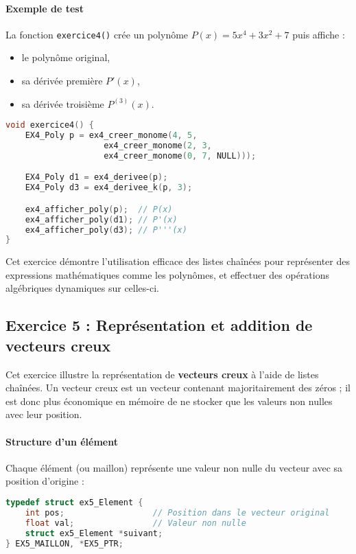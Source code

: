 \documentclass[a4paper,12pt]{article}
\begin{document}
\paragraph{Exemple de test}

La fonction \texttt{exercice4()} crée un polynôme $P(x) = 5x^4 + 3x^2 + 7$ puis affiche :

\begin{itemize}
    \item le polynôme original,
    \item sa dérivée première $P'(x)$,
    \item sa dérivée troisième $P^{(3)}(x)$.
\end{itemize}

\begin{lstlisting}[language=C, caption={Exemple de test}]
void exercice4() {
    EX4_Poly p = ex4_creer_monome(4, 5,
                    ex4_creer_monome(2, 3,
                    ex4_creer_monome(0, 7, NULL)));

    EX4_Poly d1 = ex4_derivee(p);
    EX4_Poly d3 = ex4_derivee_k(p, 3);

    ex4_afficher_poly(p);  // P(x)
    ex4_afficher_poly(d1); // P'(x)
    ex4_afficher_poly(d3); // P'''(x)
}
\end{lstlisting}

Cet exercice démontre l’utilisation efficace des listes chaînées pour représenter des expressions mathématiques comme les polynômes, et effectuer des opérations algébriques dynamiques sur celles-ci.


\subsection{Exercice 5 : Représentation et addition de vecteurs creux}

Cet exercice illustre la représentation de \textbf{vecteurs creux} à l’aide de listes chaînées. Un vecteur creux est un vecteur contenant majoritairement des zéros ; il est donc plus économique en mémoire de ne stocker que les valeurs non nulles avec leur position.

\paragraph{Structure d’un élément}

Chaque élément (ou maillon) représente une valeur non nulle du vecteur avec sa position d’origine :

\begin{lstlisting}[language=C, caption={Structure d’un vecteur creux}]
typedef struct ex5_Element {
    int pos;                  // Position dans le vecteur original
    float val;                // Valeur non nulle
    struct ex5_Element *suivant;
} EX5_MAILLON, *EX5_PTR;
\end{lstlisting}
\end{document}
